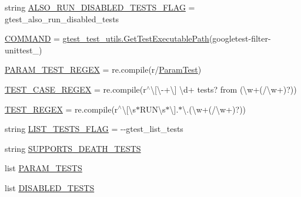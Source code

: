 \begin{DoxyCompactItemize}
\item 
string \mbox{\hyperlink{namespacegoogletest-filter-unittest_abf498ba8de8ed89f11e552d89108a79f}{A\+L\+S\+O\+\_\+\+R\+U\+N\+\_\+\+D\+I\+S\+A\+B\+L\+E\+D\+\_\+\+T\+E\+S\+T\+S\+\_\+\+F\+L\+AG}} = \textquotesingle{}gtest\+\_\+also\+\_\+run\+\_\+disabled\+\_\+tests\textquotesingle{}
\item 
\mbox{\hyperlink{namespacegoogletest-filter-unittest_a0d1ea907e2ca14e1335cbf270df41bac}{C\+O\+M\+M\+A\+ND}} = \mbox{\hyperlink{namespacegtest__test__utils_a89ed3717984a80ffbb7a9c92f71b86a2}{gtest\+\_\+test\+\_\+utils.\+Get\+Test\+Executable\+Path}}(\textquotesingle{}googletest-\/filter-\/unittest\+\_\+\textquotesingle{})
\item 
\mbox{\hyperlink{namespacegoogletest-filter-unittest_af77bfd6536a2e3193efc40a697c0d973}{P\+A\+R\+A\+M\+\_\+\+T\+E\+S\+T\+\_\+\+R\+E\+G\+EX}} = re.\+compile(r\textquotesingle{}/\mbox{\hyperlink{class_param_test}{Param\+Test}}\textquotesingle{})
\item 
\mbox{\hyperlink{namespacegoogletest-filter-unittest_a7a56afb8dd8204a811746ffe2ae508cb}{T\+E\+S\+T\+\_\+\+C\+A\+S\+E\+\_\+\+R\+E\+G\+EX}} = re.\+compile(r\textquotesingle{}$^\wedge$\textbackslash{}\mbox{[}\textbackslash{}-\/+\textbackslash{}\mbox{]} \textbackslash{}d+ tests? from (\textbackslash{}w+(/\textbackslash{}w+)?)\textquotesingle{})
\item 
\mbox{\hyperlink{namespacegoogletest-filter-unittest_aa92cd55f293bfe9c69a9cfcd12f2486d}{T\+E\+S\+T\+\_\+\+R\+E\+G\+EX}} = re.\+compile(r\textquotesingle{}$^\wedge$\textbackslash{}\mbox{[}\textbackslash{}s$\ast$R\+U\+N\textbackslash{}s$\ast$\textbackslash{}\mbox{]}.$\ast$\textbackslash{}.(\textbackslash{}w+(/\textbackslash{}w+)?)\textquotesingle{})
\item 
string \mbox{\hyperlink{namespacegoogletest-filter-unittest_a74c619e65e9f5ff467438c37936138d1}{L\+I\+S\+T\+\_\+\+T\+E\+S\+T\+S\+\_\+\+F\+L\+AG}} = \textquotesingle{}-\/-\/gtest\+\_\+list\+\_\+tests\textquotesingle{}
\item 
string \mbox{\hyperlink{namespacegoogletest-filter-unittest_a5aaa3e6381c05a68e780b8050e524644}{S\+U\+P\+P\+O\+R\+T\+S\+\_\+\+D\+E\+A\+T\+H\+\_\+\+T\+E\+S\+TS}}
\item 
list \mbox{\hyperlink{namespacegoogletest-filter-unittest_a4680842a08f38e6579ce5f1246c23063}{P\+A\+R\+A\+M\+\_\+\+T\+E\+S\+TS}}
\item 
list \mbox{\hyperlink{namespacegoogletest-filter-unittest_a3984439b9efcce4230d56a9f91b2c16d}{D\+I\+S\+A\+B\+L\+E\+D\+\_\+\+T\+E\+S\+TS}}

\end{DoxyCompactItemize}
